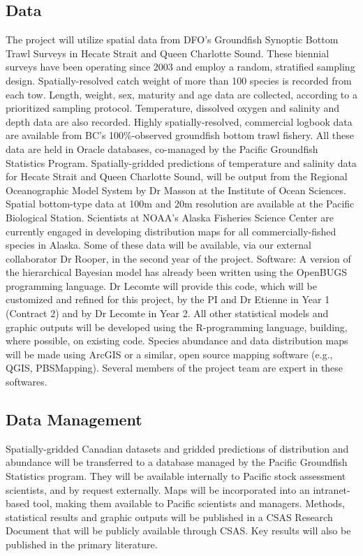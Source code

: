 \documentclass[11pt]{book}\usepackage[]{graphicx}\usepackage[]{color}
\begin{document}
\subsection{Data}
The project will utilize spatial data from DFO's Groundfish Synoptic Bottom Trawl Surveys in Hecate Strait and Queen Charlotte Sound. These biennial surveys have been operating since 2003 and employ a random, stratified sampling design. Spatially-resolved catch weight of more than 100 species is recorded from each tow. Length, weight, sex, maturity and age data are collected, according to a prioritized sampling protocol. Temperature, dissolved oxygen and salinity and depth data are also recorded. Highly spatially-resolved, commercial logbook data are available from BC's 100\%-observed groundfish bottom trawl fishery. All these data are held in Oracle databases, co-managed by the Pacific Groundfish Statistics Program. Spatially-gridded predictions of temperature and salinity data for Hecate Strait and Queen Charlotte Sound, will be output from the Regional Oceanographic Model System by Dr Masson at the Institute of Ocean Sciences. Spatial bottom-type data at 100m and 20m resolution are available at the Pacific Biological Station. Scientists at NOAA's Alaska Fisheries Science Center are currently engaged in developing distribution maps for all commercially-fished species in Alaska. Some of these data will be available, via our external collaborator Dr Rooper, in the second year of the project.
Software: A version of the hierarchical Bayesian model has already been written using the OpenBUGS programming language. Dr Lecomte will provide this code, which will be customized and refined for this project, by the PI and Dr Etienne in Year 1 (Contract 2) and by Dr Lecomte in Year 2. All other statistical models and graphic outputs will be developed using the R-programming language, building, where possible, on existing code. Species abundance and data distribution maps will be made using ArcGIS or a similar, open source mapping software (e.g., QGIS, PBSMapping). Several members of the project team are expert in these softwares.

\subsection{Data Management}
Spatially-gridded Canadian datasets and gridded predictions of distribution and abundance will be transferred to a database managed by the Pacific Groundfish Statistics program.  They will be available internally to Pacific stock assessment scientists, and by request externally. Maps will be incorporated into an intranet-based tool, making them available to Pacific scientists and managers. Methods, statistical results and graphic outputs will be published in a CSAS Research Document that will be publicly available through CSAS. Key results will also be published in the primary literature. 
\end{document}
